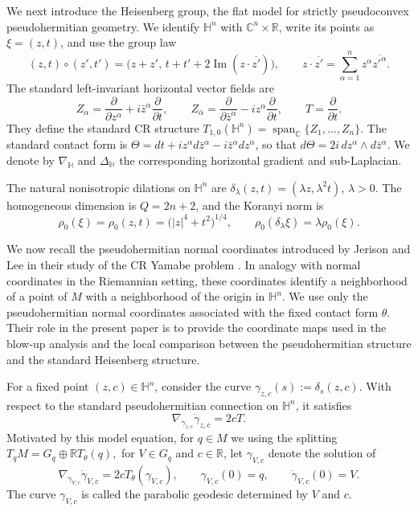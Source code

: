 \documentclass[11pt]{article}
\numberwithin{equation}{section}
\newcounter{problem}
\numberwithin{equation}{section}
\begin{document}
	We next introduce the Heisenberg group, the flat model for strictly pseudoconvex pseudohermitian geometry. We identify \(\mathbb H^n\) with \(\mathbb C^n\times\mathbb R\), write its points as \(\xi=(z,t)\), and use the group law
	\[
	(z,t)\circ(z',t') =\bigl(z+z',\,t+t'+2\operatorname{Im}(z\cdot\overline{z'})\bigr), \qquad z\cdot\overline{z'}=\sum_{\alpha=1}^n z^\alpha\overline{z'^\alpha}.
	\]
	The standard left-invariant horizontal vector fields are
	\[
	Z_\alpha=\frac{\partial}{\partial z^\alpha} +i\bar z^\alpha\frac{\partial}{\partial t}, \qquad Z_{\bar\alpha}=\frac{\partial}{\partial\bar z^\alpha} -iz^\alpha\frac{\partial}{\partial t}, \qquad T=\frac{\partial}{\partial t}.
	\]
	They define the standard CR structure \(T_{1,0}(\mathbb H^n)=\operatorname{span}_{\mathbb C}\{Z_1,\ldots,Z_n\}\). The standard contact form is \(\Theta=dt+i z^\alpha d\bar z^\alpha-i\bar z^\alpha dz^\alpha\), so that \(d\Theta=2i\,dz^\alpha\wedge d\bar z^\alpha\). We denote by \(\nabla_{\mathbb H}\) and \(\Delta_{\mathbb H}\) the corresponding horizontal gradient and sub-Laplacian.
	
	The natural nonisotropic dilations on \(\mathbb H^n\) are \(\delta_\lambda(z,t)=(\lambda z,\lambda^2t)\), \(\lambda>0\). The homogeneous dimension is \(Q=2n+2\), and the Koranyi norm is
	\[
	\rho_0(\xi)=\rho_0(z,t)=\bigl(|z|^4+t^2\bigr)^{1/4}, \qquad \rho_0(\delta_\lambda\xi)=\lambda\rho_0(\xi).
	\]

	We now recall the pseudohermitian normal coordinates introduced by
Jerison and Lee in their study of the CR Yamabe problem
\cite{JL1989}.  In analogy with normal coordinates in the Riemannian
setting, these coordinates identify a neighborhood of a point of \(M\) with
a neighborhood of the origin in \(\mathbb H^n\).  We use only the
pseudohermitian normal coordinates associated with the fixed contact form
\(\theta\).  Their role in the present paper is to provide the coordinate
maps used in the blow-up analysis and the local comparison between the
pseudohermitian structure and the standard Heisenberg structure.



For a fixed point \((z,c)\in\mathbb H^n\), consider the curve
\(
\gamma_{z,c}(s):=\delta_s(z,c).
\)
With respect to the standard pseudohermitian connection on
\(\mathbb H^n\), it satisfies
\[
\nabla_{\dot\gamma_{z,c}}\dot\gamma_{z,c}=2cT.
\]
Motivated by this model equation, for \(q\in M\) we using the splitting
\(
T_qM=G_q\oplus\mathbb RT_\theta(q),
\)
for \(V\in G_q\) and \(c\in\mathbb R\), let \(\gamma_{V,c}\) denote the
solution of
\begin{equation}\label{eq:parabolic-geodesic}
\nabla_{\dot\gamma_{V,c}}\dot\gamma_{V,c}
=
2cT_\theta(\gamma_{V,c}),
\qquad
\gamma_{V,c}(0)=q,
\qquad
\dot\gamma_{V,c}(0)=V.
\end{equation}
The curve \(\gamma_{V,c}\) is called the parabolic geodesic determined by
\(V\) and \(c\).
\end{document}
